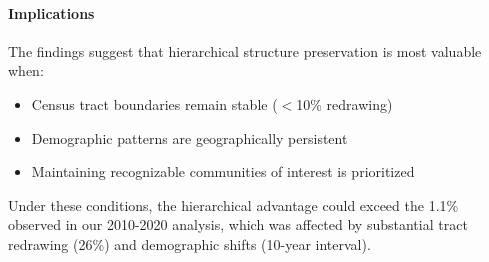 \paragraph{Implications} The findings suggest that hierarchical structure preservation is most valuable when:
\begin{itemize}
\item Census tract boundaries remain stable ($<$10\% redrawing)
\item Demographic patterns are geographically persistent
\item Maintaining recognizable communities of interest is prioritized
\end{itemize}

Under these conditions, the hierarchical advantage could exceed the 1.1\% observed in our 2010-2020 analysis, which was affected by substantial tract redrawing (26\%) and demographic shifts (10-year interval).
